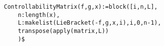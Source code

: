 \noindent
\begin{minipage}[t]{\textwidth}\color{blue}
\begin{verbatim}
ControllabilityMatrix(f,g,x):=block([i,n,L],
    n:length(x),
    L:makelist(LieBracket(-f,g,x,i),i,0,n-1),
    transpose(apply(matrix,L))
    )$
\end{verbatim}
\end{minipage}
